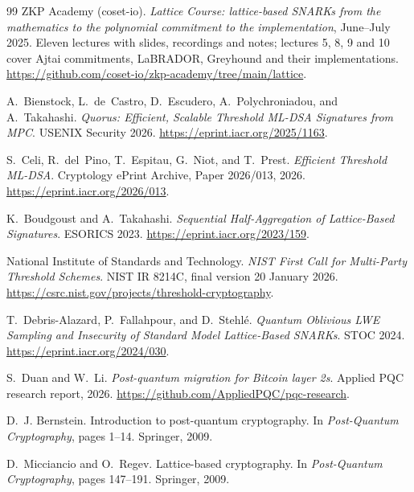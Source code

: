 \begin{thebibliography}{99}
 ZKP Academy (coset-io).
\newblock \emph{Lattice Course: lattice-based SNARKs from the mathematics to the
polynomial commitment to the implementation}, June--July 2025.
\newblock Eleven lectures with slides, recordings and notes; lectures 5, 8, 9
and 10 cover Ajtai commitments, LaBRADOR, Greyhound and their implementations.
\newblock \url{https://github.com/coset-io/zkp-academy/tree/main/lattice}.

 A.~Bienstock, L.~de~Castro, D.~Escudero, A.~Polychroniadou, and A.~Takahashi.
\newblock \emph{Quorus: Efficient, Scalable Threshold ML-DSA Signatures from MPC}.
\newblock USENIX Security 2026.
\newblock \url{https://eprint.iacr.org/2025/1163}.

 S.~Celi, R.~del~Pino, T.~Espitau, G.~Niot, and T.~Prest.
\newblock \emph{Efficient Threshold ML-DSA}.
\newblock Cryptology ePrint Archive, Paper 2026/013, 2026.
\newblock \url{https://eprint.iacr.org/2026/013}.

 K.~Boudgoust and A.~Takahashi.
\newblock \emph{Sequential Half-Aggregation of Lattice-Based Signatures}.
\newblock ESORICS 2023.
\newblock \url{https://eprint.iacr.org/2023/159}.

 National Institute of Standards and Technology.
\newblock \emph{NIST First Call for Multi-Party Threshold Schemes}.
\newblock NIST IR 8214C, final version 20 January 2026.
\newblock \url{https://csrc.nist.gov/projects/threshold-cryptography}.

 T.~Debris-Alazard, P.~Fallahpour, and D.~Stehl\'{e}.
\newblock \emph{Quantum Oblivious LWE Sampling and Insecurity of Standard Model
Lattice-Based SNARKs}.
\newblock STOC 2024.
\newblock \url{https://eprint.iacr.org/2024/030}.

 S.~Duan and W.~Li.
\newblock \emph{Post-quantum migration for Bitcoin layer 2s}.
\newblock Applied PQC research report, 2026.
\newblock \url{https://github.com/AppliedPQC/pqc-research}.

 D.~J. Bernstein.
\newblock Introduction to post-quantum cryptography.
\newblock In \emph{Post-Quantum Cryptography}, pages 1--14. Springer, 2009.

 D.~Micciancio and O.~Regev.
\newblock Lattice-based cryptography.
\newblock In \emph{Post-Quantum Cryptography}, pages 147--191. Springer, 2009.


\end{thebibliography}

